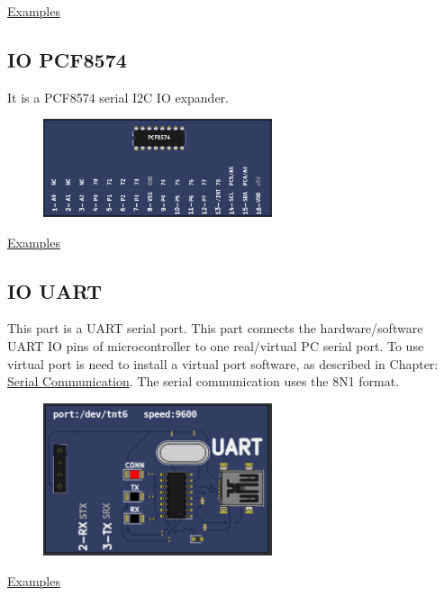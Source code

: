 \href{https://lcgamboa.github.io/picsimlab_examples/parts_IO_MCP23S17.html}{Examples}

\subsection{IO PCF8574}

It is a PCF8574 serial I2C IO expander.

\begin{figure}[H]
\center
\includegraphics[width=0.6\textwidth]{img/part_pcf8574.png} 
\end{figure} 

\href{https://lcgamboa.github.io/picsimlab_examples/parts_IO_PCF8574.html}{Examples}


\subsection{IO UART}

This part is a UART serial port. This part connects the hardware/software UART IO pins of microcontroller to
one real/virtual PC serial port. To use virtual port is need to install a virtual port software, as 
described in Chapter: \hyperlink{def:seriali}{Serial Communication}. 
The serial communication uses the 8N1 format.

\begin{figure}[H]
\center
\includegraphics[width=0.6\textwidth]{img/part_uart.png} 
\end{figure} 

\href{https://lcgamboa.github.io/picsimlab_examples/parts_IO_UART.html}{Examples}


